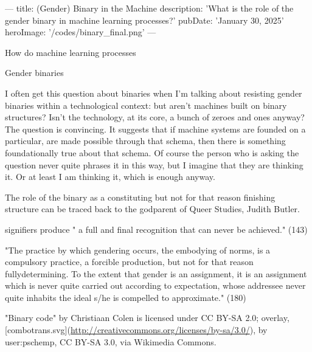 \documentclass[11pt]{article}
\author{fcalado}
\date{\today}
\title{}
\begin{document}
\tableofcontents

---
title: (Gender) Binary in the Machine
description: 'What is the role of the gender binary in machine
learning processes?'
pubDate: 'January 30, 2025'
heroImage: '/codes/binary\_final.png'
---

How do machine learning processes

Gender binaries

I often get this question about binaries when I'm talking about
resisting gender binaries within a technological context: but aren't
machines built on binary structures? Isn't the technology, at its
core, a bunch of zeroes and ones anyway? The question is convincing.
It suggests that if machine systems are founded on a particular, are
made possible through that schema, then there is something
foundationally true about that schema. Of course the person who is
asking the question never quite phrases it in this way, but I imagine
that they are thinking it. Or at least I am thinking it, which is
enough anyway.

The role of the binary as a constituting but not for that reason
finishing structure can be traced back to the godparent of Queer
Studies, Judith Butler. 


signifiers produce " a full and final recognition that can never be
achieved." (143)

"The practice by which gendering occurs, the embodying of norms, is a
compulsory practice, a forcible production, but not for that reason
fullydetermining. To the extent that gender is an assignment, it is an
assignment which is never quite carried out according to expectation,
whose addressee never quite inhabits the ideal s/he is compelled to
approximate." (180)


"Binary code" by Christiaan Colen is licensed under CC BY-SA 2.0;
overlay,
[combotrans.svg](\url{http://creativecommons.org/licenses/by-sa/3.0/}), by
user:pschemp, CC BY-SA 3.0, via Wikimedia Commons. 
\end{document}
